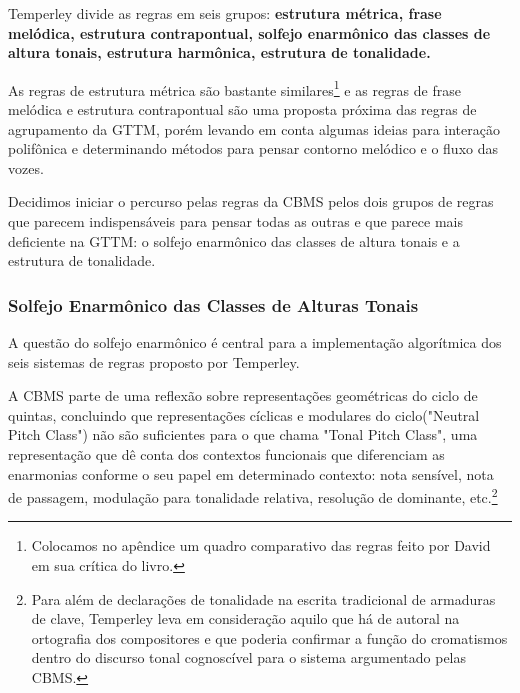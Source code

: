 \documentclass[
	12pt,				%
	openright,			%
	twoside,			%
	a4paper,			%
	english,			%
	french,				%
	spanish,			%
	brazil				%
	]{abntex2}
\begin{document}
Temperley divide as regras em seis grupos: \textbf{estrutura métrica, frase melódica, estrutura contrapontual, solfejo enarmônico das classes de altura tonais, estrutura harmônica, estrutura de tonalidade.}

As regras de estrutura métrica são bastante similares\footnote{Colocamos no apêndice um quadro comparativo das regras feito por David  em sua crítica do livro.  } e as regras de frase melódica e estrutura contrapontual são uma proposta próxima das regras de agrupamento da GTTM, porém levando em conta algumas ideias para interação polifônica e determinando métodos para pensar contorno melódico e o fluxo das vozes. 

Decidimos iniciar o percurso pelas regras da CBMS pelos dois grupos de regras que parecem indispensáveis para pensar todas as outras e que parece mais deficiente na GTTM: o solfejo enarmônico das classes de altura tonais e a estrutura de tonalidade. 


\subsubsection{Solfejo Enarmônico das Classes de Alturas Tonais}

A questão do solfejo enarmônico é central para a implementação algorítmica dos seis sistemas de regras proposto por Temperley.

A CBMS parte de uma reflexão sobre representações geométricas do ciclo de quintas, concluindo que representações cíclicas e modulares do ciclo("Neutral Pitch Class") não são suficientes para o que chama "Tonal Pitch Class", uma representação que dê conta dos contextos funcionais que diferenciam as enarmonias conforme o seu papel em determinado contexto: nota sensível, nota de passagem, modulação para tonalidade relativa, resolução de dominante, etc.\footnote{Para além de declarações de tonalidade na escrita tradicional de armaduras de clave, Temperley leva em consideração aquilo que há de autoral na ortografia\cite[p.123]{temperley2004cognition}  dos compositores e que poderia confirmar a função do cromatismos dentro do discurso tonal cognoscível para o sistema argumentado pelas CBMS.}
\end{document}
